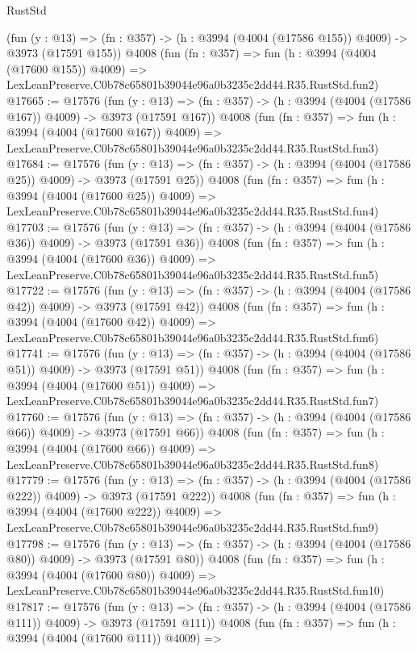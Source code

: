\begin{lexlean}{RustStd}
\begin{coremodule}
    (fun (y : @13) => (fn : @357) -> (h : @3994 (@4004 (@17586 @155)) @4009) -> @3973 (@17591 @155))
    @4008
    (fun (fn : @357) =>
    fun (h : @3994 (@4004 (@17600 @155)) @4009) =>
    LexLeanPreserve.C0b78c65801b39044e96a0b3235c2dd44.R35.RustStd.fun2)
@17665 := @17576
    (fun (y : @13) => (fn : @357) -> (h : @3994 (@4004 (@17586 @167)) @4009) -> @3973 (@17591 @167))
    @4008
    (fun (fn : @357) =>
    fun (h : @3994 (@4004 (@17600 @167)) @4009) =>
    LexLeanPreserve.C0b78c65801b39044e96a0b3235c2dd44.R35.RustStd.fun3)
@17684 := @17576
    (fun (y : @13) => (fn : @357) -> (h : @3994 (@4004 (@17586 @25)) @4009) -> @3973 (@17591 @25))
    @4008
    (fun (fn : @357) =>
    fun (h : @3994 (@4004 (@17600 @25)) @4009) =>
    LexLeanPreserve.C0b78c65801b39044e96a0b3235c2dd44.R35.RustStd.fun4)
@17703 := @17576
    (fun (y : @13) => (fn : @357) -> (h : @3994 (@4004 (@17586 @36)) @4009) -> @3973 (@17591 @36))
    @4008
    (fun (fn : @357) =>
    fun (h : @3994 (@4004 (@17600 @36)) @4009) =>
    LexLeanPreserve.C0b78c65801b39044e96a0b3235c2dd44.R35.RustStd.fun5)
@17722 := @17576
    (fun (y : @13) => (fn : @357) -> (h : @3994 (@4004 (@17586 @42)) @4009) -> @3973 (@17591 @42))
    @4008
    (fun (fn : @357) =>
    fun (h : @3994 (@4004 (@17600 @42)) @4009) =>
    LexLeanPreserve.C0b78c65801b39044e96a0b3235c2dd44.R35.RustStd.fun6)
@17741 := @17576
    (fun (y : @13) => (fn : @357) -> (h : @3994 (@4004 (@17586 @51)) @4009) -> @3973 (@17591 @51))
    @4008
    (fun (fn : @357) =>
    fun (h : @3994 (@4004 (@17600 @51)) @4009) =>
    LexLeanPreserve.C0b78c65801b39044e96a0b3235c2dd44.R35.RustStd.fun7)
@17760 := @17576
    (fun (y : @13) => (fn : @357) -> (h : @3994 (@4004 (@17586 @66)) @4009) -> @3973 (@17591 @66))
    @4008
    (fun (fn : @357) =>
    fun (h : @3994 (@4004 (@17600 @66)) @4009) =>
    LexLeanPreserve.C0b78c65801b39044e96a0b3235c2dd44.R35.RustStd.fun8)
@17779 := @17576
    (fun (y : @13) => (fn : @357) -> (h : @3994 (@4004 (@17586 @222)) @4009) -> @3973 (@17591 @222))
    @4008
    (fun (fn : @357) =>
    fun (h : @3994 (@4004 (@17600 @222)) @4009) =>
    LexLeanPreserve.C0b78c65801b39044e96a0b3235c2dd44.R35.RustStd.fun9)
@17798 := @17576
    (fun (y : @13) => (fn : @357) -> (h : @3994 (@4004 (@17586 @80)) @4009) -> @3973 (@17591 @80))
    @4008
    (fun (fn : @357) =>
    fun (h : @3994 (@4004 (@17600 @80)) @4009) =>
    LexLeanPreserve.C0b78c65801b39044e96a0b3235c2dd44.R35.RustStd.fun10)
@17817 := @17576
    (fun (y : @13) => (fn : @357) -> (h : @3994 (@4004 (@17586 @111)) @4009) -> @3973 (@17591 @111))
    @4008
    (fun (fn : @357) =>
    fun (h : @3994 (@4004 (@17600 @111)) @4009) =>

\end{coremodule}
\end{lexlean}
